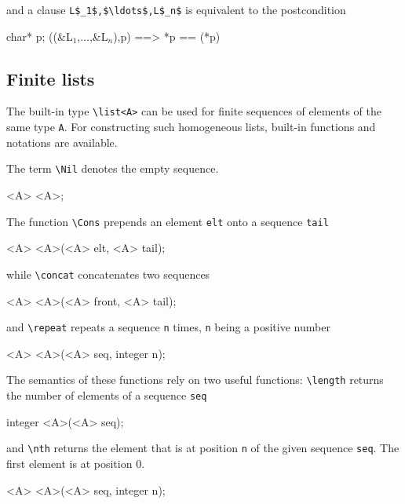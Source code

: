 and a clause \assigns \lstinline|L$_1$,$\ldots$,L$_n$| is equivalent
to the postcondition
\begin{listing-nonumber}
\forall char* p; \separated(\union(&L$_1$,$\ldots$,&L$_n$),p) ==> *p == \old(*p)
\end{listing-nonumber}

\subsection{Finite lists}\label{sec:lists}
The built-in type \lstinline|\list<A>| can be used for finite 
sequences of elements of the same type \lstinline|A|. 
For constructing such homogeneous lists, built-in functions and notations are 
available.

The term \lstinline|\Nil| denotes the empty sequence.
\begin{listing-nonumber}
\list<A> \Nil<A>;
\end{listing-nonumber}

The function \lstinline|\Cons| prepends an element \lstinline|elt| 
onto a sequence \lstinline|tail|
\begin{listing-nonumber}
\list<A> \Cons<A>(<A> elt, \list<A> tail);
\end{listing-nonumber}
while \lstinline|\concat| concatenates two sequences
\begin{listing-nonumber}
\list<A> \concat<A>(\list<A> front, \list<A> tail);
\end{listing-nonumber}
and \lstinline|\repeat| repeats a sequence \lstinline|n| times, \lstinline|n| being a positive number
\begin{listing-nonumber}
\list<A> \repeat<A>(\list<A> seq, integer n);
\end{listing-nonumber}

The semantics of these functions rely on two useful functions: 
\lstinline|\length| returns the number of elements of 
a sequence \lstinline|seq| 
\begin{listing-nonumber}
integer \length<A>(\list<A> seq);
\end{listing-nonumber}
and \lstinline|\nth| returns the element that is at position 
\lstinline|n| of the given sequence \lstinline|seq|.
The first element is at position $0$. 
\begin{listing-nonumber}
<A> \nth<A>(\list<A> seq, integer n);
\end{listing-nonumber}

